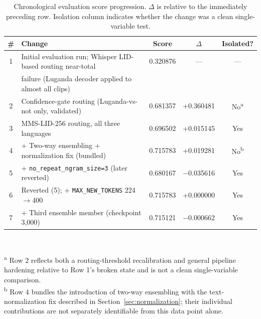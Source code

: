 \documentclass[11pt]{article}
\begin{document}
\begin{table}[htbp]
\centering
\caption{Chronological evaluation score progression. $\Delta$ is relative to the immediately preceding row. Isolation column indicates whether the change was a clean single-variable test.}
\label{tab:scores}

\begin{tabular}{clccc}
\toprule
\# & Change & Score & $\Delta$ & Isolated? \\
\midrule
1 & Initial evaluation run; Whisper LID-based routing near-total & 0.320876 & --- & --- \\
  & failure (Luganda decoder applied to almost all clips) & & & \\
2 & Confidence-gate routing (Luganda-vs-not only, validated) & 0.681357 & +0.360481 & No\textsuperscript{a} \\
3 & MMS-LID-256 routing, all three languages & 0.696502 & +0.015145 & Yes \\
4 & + Two-way ensembling + normalization fix (bundled) & 0.715783 & +0.019281 & No\textsuperscript{b} \\
5 & + \texttt{no\_repeat\_ngram\_size=3} (later reverted) & 0.680167 & $-$0.035616 & Yes \\
6 & Reverted (5); + \texttt{MAX\_NEW\_TOKENS} 224$\to$400 & 0.715783 & +0.000000 & Yes \\
7 & + Third ensemble member (checkpoint 3{,}000) & 0.715121 & $-$0.000662 & Yes \\
\bottomrule
\end{tabular}
\\[4pt]
\raggedright
\textsuperscript{a} Row 2 reflects both a routing-threshold recalibration and general pipeline hardening relative to Row 1's broken state and is not a clean single-variable comparison.\\
\textsuperscript{b} Row 4 bundles the introduction of two-way ensembling with the text-normalization fix described in Section~\ref{sec:normalization}; their individual contributions are not separately identifiable from this data point alone.
\end{table}
\end{document}
